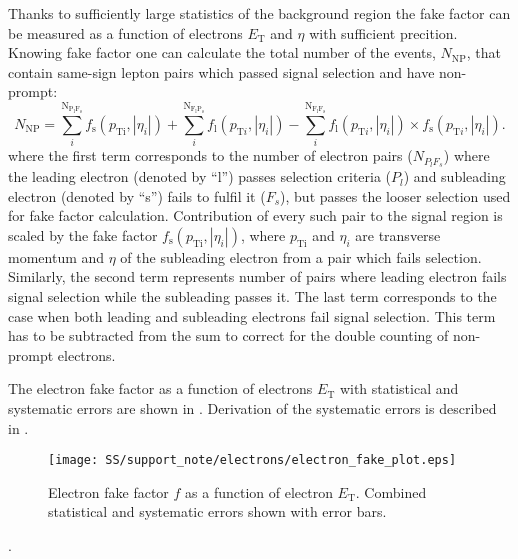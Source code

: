 Thanks to sufficiently large statistics of the background region the fake factor can be measured as a function of 
electrons $E_\mathrm{T}$ and $\eta$ with sufficient precition. 
Knowing fake factor one can calculate the total number of the events,
$N_{\mathrm{NP}}$, that contain same-sign lepton pairs which passed signal selection 
and have non-prompt:
\begin{equation}
N_{\mathrm{NP}} = \sum_{i}^{\mathrm{N_{P_l F_s}}} f_{\mathrm{s}}(p_{\mathrm{Ti}},|\eta_{i}|) + \sum_{i}^{\mathrm{N_{F_l P_s}}} f_{\mathrm{l}}(p_{\mathrm{T}i},|\eta_{i}|) - \sum_{i}^{\mathrm{N_{F_l F_s}}} f_{\mathrm{l}}(p_{\mathrm{T}i},|\eta_{i}|) \times f_{\mathrm{s}}(p_{\mathrm{T}i},|\eta_{i}|).
\label{eq:fake_pred}
\end{equation}
where the first term corresponds to the number of electron pairs ($N_{P_l F_s}$) 
where the leading electron (denoted by ``l'') passes selection criteria ($P_l$) and subleading electron 
(denoted by ``s'')
fails to fulfil it ($F_s$), but passes the looser selection used for fake factor calculation. 
Contribution of every such pair to the signal region is scaled by the fake factor 
$f_{\mathrm{s}}(p_{\mathrm{Ti}},|\eta_{i}|)$, where $p_\mathrm{Ti}$ and $\eta_{i}$ are transverse momentum and $\eta$
of the subleading electron from a pair which fails selection. 
Similarly, the second term represents number of pairs where
leading electron fails signal selection while the subleading passes it. 
The last term corresponds to the case when both leading
and subleading electrons fail signal selection. This term has to be subtracted from the sum to correct for the double
counting of non-prompt electrons.

The electron fake factor as a function of electrons $E_\mathrm{T}$ with statistical and systematic errors are
shown in . Derivation of the systematic errors is described in .
\begin{figure}[h]
\begin{center}
\texttt{[image: SS/support\_note/electrons/electron\_fake\_plot.eps]}
\caption{Electron fake factor $f$ as a function of electron $E_\mathrm{T}$. Combined statistical and systematic errors shown with error bars.}
\label{fig:ff_e_errs}
\end{center}
\end{figure} 
.

